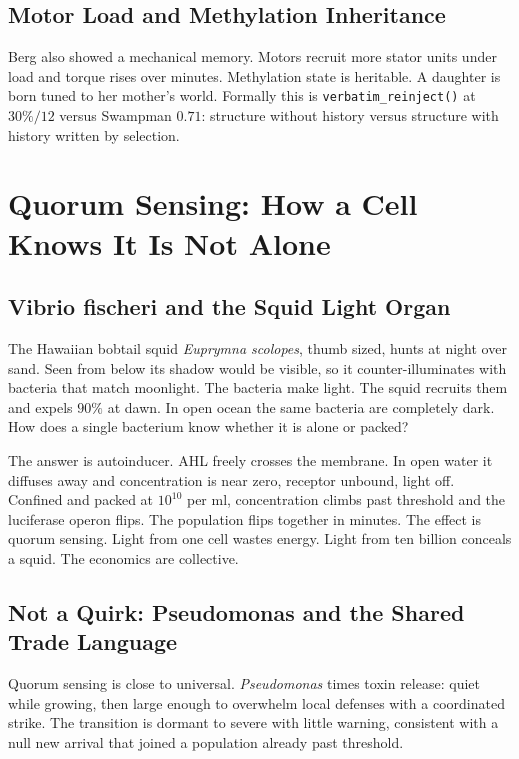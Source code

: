\documentclass[11pt,a4paper]{article}
\begin{document}
\subsection{Motor Load and Methylation Inheritance}

Berg also showed a mechanical memory. Motors recruit more stator units under load and torque rises over minutes. Methylation state is heritable. A daughter is born tuned to her mother's world. Formally this is \texttt{verbatim\_reinject()} at $30\%/12$ versus Swampman $0.71$: structure without history versus structure with history written by selection.

\section{Quorum Sensing: How a Cell Knows It Is Not Alone}
\label{sec:quorum}

\subsection{Vibrio fischeri and the Squid Light Organ}

The Hawaiian bobtail squid \textit{Euprymna scolopes}, thumb sized, hunts at night over sand. Seen from below its shadow would be visible, so it counter-illuminates with bacteria that match moonlight. The bacteria make light. The squid recruits them and expels $90\%$ at dawn. In open ocean the same bacteria are completely dark. How does a single bacterium know whether it is alone or packed?

The answer is autoinducer. AHL freely crosses the membrane. In open water it diffuses away and concentration is near zero, receptor unbound, light off. Confined and packed at $10^{10}$ per ml, concentration climbs past threshold and the luciferase operon flips. The population flips together in minutes. The effect is quorum sensing. Light from one cell wastes energy. Light from ten billion conceals a squid. The economics are collective.

\subsection{Not a Quirk: Pseudomonas and the Shared Trade Language}

Quorum sensing is close to universal. \textit{Pseudomonas} times toxin release: quiet while growing, then large enough to overwhelm local defenses with a coordinated strike. The transition is dormant to severe with little warning, consistent with a null new arrival that joined a population already past threshold.
\end{document}
